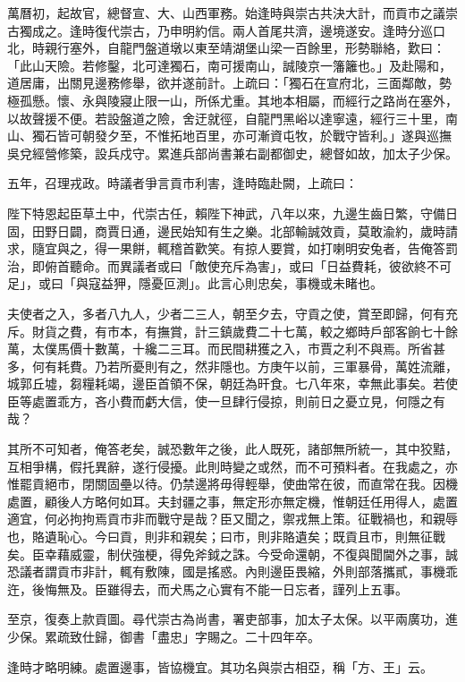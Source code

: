 \begin{pinyinscope}
萬曆初，起故官，總督宣、大、山西軍務。始逢時與崇古共決大計，而貢市之議崇古獨成之。逢時復代崇古，乃申明約信。兩人首尾共濟，邊境遂安。逢時分巡口北，時親行塞外，自龍門盤道墩以東至靖湖堡山梁一百餘里，形勢聯絡，歎曰：「此山天險。若修鑿，北可達獨石，南可援南山，誠陵京一籓籬也。」及赴陽和，道居庸，出關見邊務修舉，欲并遂前計。上疏曰：「獨石在宣府北，三面鄰敵，勢極孤懸。懷、永與陵寢止限一山，所係尤重。其地本相屬，而經行之路尚在塞外，以故聲援不便。若設盤道之險，舍迂就徑，自龍門黑峪以達寧遠，經行三十里，南山、獨石皆可朝發夕至，不惟拓地百里，亦可漸資屯牧，於戰守皆利。」遂與巡撫吳兌經營修築，設兵戍守。累進兵部尚書兼右副都御史，總督如故，加太子少保。

五年，召理戎政。時議者爭言貢市利害，逢時臨赴闕，上疏曰：

陛下特恩起臣草土中，代崇古任，賴陛下神武，八年以來，九邊生齒日繁，守備日固，田野日闢，商賈日通，邊民始知有生之樂。北部輸誠效貢，莫敢渝約，歲時請求，隨宜與之，得一果餅，輒稽首歡笑。有掠人要賞，如打喇明安兔者，告俺答罰治，即俯首聽命。而異議者或曰「敵使充斥為害」，或曰「日益費耗，彼欲終不可足」，或曰「與寇益狎，隱憂叵測」。此言心則忠矣，事機或未睹也。

夫使者之入，多者八九人，少者二三人，朝至夕去，守貢之使，賞至即歸，何有充斥。財貨之費，有市本，有撫賞，計三鎮歲費二十七萬，較之鄉時戶部客餉七十餘萬，太僕馬價十數萬，十纔二三耳。而民間耕獲之入，市賈之利不與焉。所省甚多，何有耗費。乃若所憂則有之，然非隱也。方庚午以前，三軍暴骨，萬姓流離，城郭丘墟，芻糧耗竭，邊臣首領不保，朝廷為旰食。七八年來，幸無此事矣。若使臣等處置乖方，吝小費而虧大信，使一旦肆行侵掠，則前日之憂立見，何隱之有哉？

其所不可知者，俺答老矣，誠恐數年之後，此人既死，諸部無所統一，其中狡黠，互相爭構，假托異辭，遂行侵擾。此則時變之或然，而不可預料者。在我處之，亦惟罷貢絕市，閉關固壘以待。仍禁邊將毋得輕舉，使曲常在彼，而直常在我。因機處置，顧後人方略何如耳。夫封疆之事，無定形亦無定機，惟朝廷任用得人，處置適宜，何必拘拘焉貢市非而戰守是哉？臣又聞之，禦戎無上策。征戰禍也，和親辱也，賂遺恥心。今曰貢，則非和親矣；曰市，則非賂遺矣；既貢且市，則無征戰矣。臣幸藉威靈，制伏強梗，得免斧鉞之誅。今受命還朝，不復與聞閫外之事，誠恐議者謂貢市非計，輒有敷陳，國是搖惑。內則邊臣畏縮，外則部落攜貳，事機乖迕，後悔無及。臣雖得去，而犬馬之心實有不能一日忘者，謹列上五事。

至京，復奏上款貢圖。尋代崇古為尚書，署吏部事，加太子太保。以平兩廣功，進少保。累疏致仕歸，御書「盡忠」字賜之。二十四年卒。

逢時才略明練。處置邊事，皆協機宜。其功名與崇古相亞，稱「方、王」云。


\end{pinyinscope}
